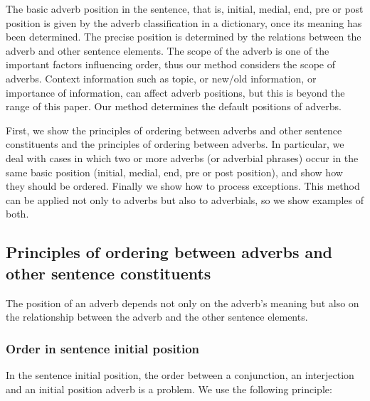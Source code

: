 The basic adverb position in the sentence, that is, initial, medial,
end, pre or post position is given by the adverb classification in a
dictionary, once its meaning has been determined.  The precise
position is determined by the relations between the adverb and other
sentence elements.  The scope of the adverb is one of the important
factors influencing order, thus our method considers the scope of
adverbs. Context information such as topic, or new/old information, or
importance of information, can affect adverb positions, but this is
beyond the range of this paper.  Our method determines the default 
positions of adverbs.

First, we show the principles of ordering between adverbs and other
sentence constituents and the principles of ordering between adverbs.
In particular, we deal with cases in which two or more adverbs (or
adverbial phrases) occur in the same basic position (initial, medial,
end, pre or post position), and show how they should be ordered.
Finally we show how to process exceptions.
This method can be applied not only to adverbs but also to adverbials,
so we show examples of both. 

\subsection{Principles of ordering between adverbs and other sentence constituents}

The position of an adverb depends not only on the adverb's meaning but
also on the relationship between the adverb and the other sentence
elements.

\subsubsection{Order in sentence initial position}

  In the sentence initial position, the order between a conjunction,
an interjection and an initial position adverb is a problem.  We use
the following principle:

